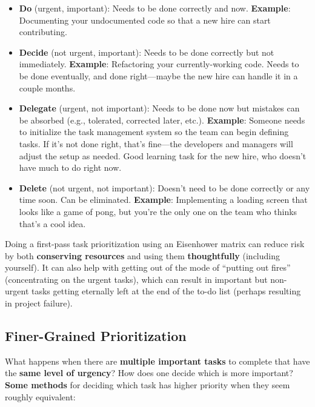 \marginpar{\eisenhowerMatrixDef}
\begin{itemize}
    \item \textbf{Do} (urgent, important): Needs to be done correctly and now. \textbf{Example}: Documenting your undocumented code so that a new hire can start contributing.
    \item \textbf{Decide} (not urgent, important): Needs to be done correctly but not immediately. \textbf{Example}: Refactoring your currently-working code. Needs to be done eventually, and done right---maybe the new hire can handle it in a couple months.
    \item \textbf{Delegate} (urgent, not important): Needs to be done now but mistakes can be absorbed (e.g., tolerated, corrected later, etc.). \textbf{Example}: Someone needs to initialize the task management system so the team can begin defining tasks. If it's not done right, that's fine---the developers and managers will adjust the setup as needed. Good learning task for the new hire, who doesn't have much to do right now.
    \item \textbf{Delete} (not urgent, not important): Doesn't need to be done correctly or any time soon. Can be eliminated. \textbf{Example}: Implementing a loading screen that looks like a game of pong, but you're the only one on the team who thinks that's a cool idea. 
\end{itemize}
Doing a first-pass task prioritization using an Eisenhower matrix can reduce risk by both \textbf{conserving resources} and using them \textbf{thoughtfully} (including yourself). It can also help with getting out of the mode of ``putting out fires'' (concentrating on the urgent tasks), which can result in important but non-urgent tasks getting eternally left at the end of the to-do list (perhaps resulting in project failure).

\subsection{Finer-Grained Prioritization}

What happens when there are \textbf{multiple important tasks} to complete that have the \textbf{same level of urgency}? How does one decide which is more important? \textbf{Some methods} for deciding which task has higher priority when they seem roughly equivalent:\\

